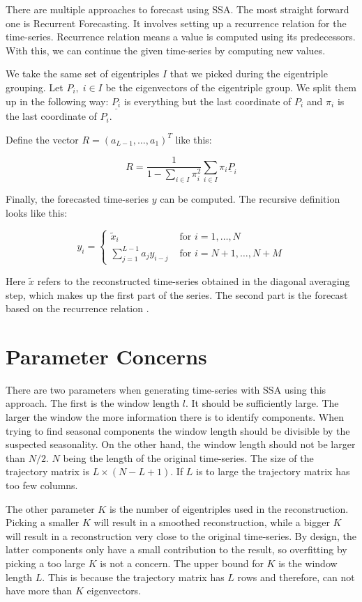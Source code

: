 There are multiple approaches to forecast using SSA. The most straight forward one is Recurrent Forecasting. It involves setting up a recurrence relation for the time-series. Recurrence relation means a value is computed using its predecessors. With this, we can continue the given time-series by computing new values. 

We take the same set of eigentriples $I$ that we picked during the eigentriple grouping. Let $P_i, \; i \in I$ be the eigenvectors of the eigentriple group. We split them up in the following way: $\underline{P_i}$ is everything but the last coordinate of $P_i$ and $\pi_i$ is the last coordinate of $P_i$. 

Define the vector $R = (a_{L-1}, \dots, a_1)^T$ like this:

\begin{equation}
   R=\frac{1}{1-\sum_{i \in I} \pi_{i}^{2}} \sum_{i \in I} \pi_{i} \underline{P}_{i}
   \label{eq:r-def}
\end{equation}

Finally, the forecasted time-series $y$ can be computed. The recursive definition looks like this:

\begin{equation}
  y_{i}=\left\{\begin{array}{ll}
\widetilde{x}_{i} & \text { for } i=1, \ldots, N \\
\sum_{j=1}^{L-1} a_{j} y_{i-j} & \text { for } i=N+1, \ldots, N+M
\end{array}\right. 
\end{equation}

\newpage

Here $\tilde{x}$ refers to the reconstructed time-series obtained in the diagonal averaging step, which makes up the first part of the series. The second part is the forecast based on the recurrence relation \parencite{golyandina2014basic}.

\section{Parameter Concerns}

There are two parameters when generating time-series with SSA using this approach. The first is the window length $l$. It should be sufficiently large. The larger the window the more information there is to identify components. When trying to find seasonal components the window length should be divisible by the suspected seasonality. On the other hand, the window length should not be larger than $N/2$. $N$ being the length of the original time-series. The size of the trajectory matrix is $L \times (N-L+1)$. If $L$ is to large the trajectory matrix has too few columns. 

The other parameter $K$ is the number of eigentriples used in the reconstruction. Picking a smaller $K$ will result in a smoothed reconstruction, while a bigger $K$ will result in a reconstruction very close to the original time-series. By design, the latter components only have a small contribution to the result, so overfitting by picking a too large $K$ is not a concern. The upper bound for $K$ is the window length $L$. This is because the trajectory matrix has $L$ rows and therefore, can not have more than $K$ eigenvectors. 